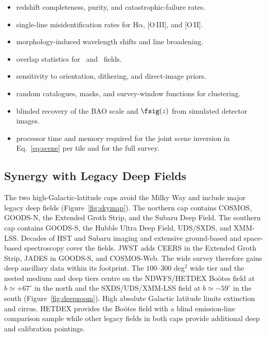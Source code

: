 \begin{itemize}
  \item redshift completeness, purity, and catastrophic-failure rates.
  \item single-line misidentification rates for H$\alpha$, [O\,III], and [O\,II].
  \item morphology-induced wavelength shifts and line broadening.
  \item overlap statistics for \fovsmall\ and \fovlarge\ fields.
  \item sensitivity to orientation, dithering, and direct-image priors.
  \item random catalogues, masks, and survey-window functions for clustering.
  \item blinded recovery of the BAO scale and $\fsig(z)$ from simulated detector images.
  \item processor time and memory required for the joint scene inversion in Eq.~\eqref{eq:scene} per tile and for the full survey.
\end{itemize}

\subsection{Synergy with Legacy Deep Fields}\label{sec:deepfields}

The two high-Galactic-latitude caps avoid the Milky Way and include major legacy deep fields (Figure~\ref{fig:skymap}). The northern cap contains COSMOS, GOODS-N, the Extended Groth Strip, and the Subaru Deep Field. The southern cap contains GOODS-S, the Hubble Ultra Deep Field, UDS/SXDS, and XMM-LSS. Decades of HST and Subaru imaging and extensive ground-based and space-based spectroscopy cover the fields. JWST adds CEERS in the Extended Groth Strip, JADES in GOODS-S, and COSMOS-Web. The wide survey therefore gains deep ancillary data within its footprint. The $100$--$300$ deg$^2$ wide tier and the nested medium and deep tiers centre on the NDWFS/HETDEX Bo\"otes field at $b\simeq+67^\circ$ in the north and the SXDS/UDS/XMM-LSS field at $b\simeq-59^\circ$ in the south (Figure~\ref{fig:deepzoom}). High absolute Galactic latitude limits extinction and cirrus. HETDEX provides the Bo\"otes field with a blind emission-line comparison sample while other legacy fields in both caps provide additional deep and calibration pointings.

